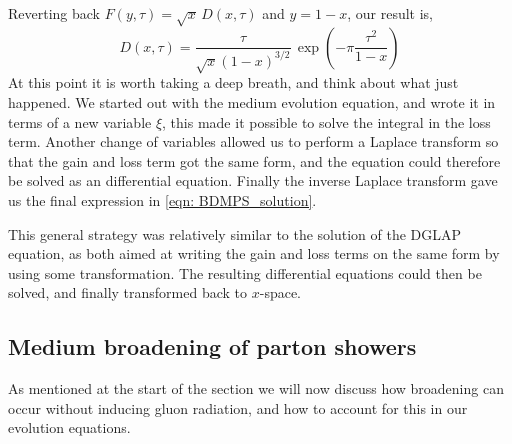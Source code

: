 \documentclass[main.tex]{subfiles}
\begin{document}
Reverting back \(F(y,\tau) = \sqrt{x}\, D(x,\tau)\) and \(y = 1-x\), our result is, 
\begin{equation}\label{eqn: BDMPS_solution}
    D(x,\tau ) = \frac{\tau}{\sqrt{x}(1-x)^{3/2}}\, \exp\left(-\pi \frac{\tau^2}{1-x}\right)
\end{equation}
At this point it is worth taking a deep breath, and think about what just happened. We started out with the medium evolution equation, and wrote it in terms of a new variable \(\xi\), this made it possible to solve the integral in the loss term. Another change of variables allowed us to perform a Laplace transform so that the gain and loss term got the same form, and the equation could therefore be solved as an differential equation. Finally the inverse Laplace transform gave us the final expression in \autoref{eqn: BDMPS_solution}.

This general strategy was relatively similar to the solution of the DGLAP equation, as both aimed at writing the gain and loss terms on the same form by using some transformation. The resulting differential equations could then be solved, and finally transformed back to \(x\)-space.

\subsection{Medium broadening of parton showers}
As mentioned at the start of the section we will now discuss how broadening can occur without inducing gluon radiation, and how to account for this in our evolution equations.
\end{document}

